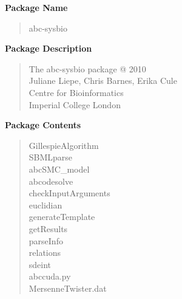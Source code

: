 \documentclass[a4paper]{report}
\begin{document}
\textbf{Package Name}
\begin{quote}abc-sysbio\end{quote}

\textbf{Package Description}
\begin{quote}
	The abc-sysbio package @ 2010\\
	Juliane Liepe, Chris Barnes, Erika Cule\\
	Centre for Bioinformatics\\
	Imperial College London\\
\end{quote}
    
\textbf{Package Contents}
\begin{quote}
    	GillespieAlgorithm\\
    	SBMLparse\\
    	abcSMC\_model\\
    	abcodesolve\\
    	checkInputArguments\\
    	euclidian\\
    	generateTemplate\\
    	getResults\\
    	parseInfo\\
    	relations\\
    	sdeint\\
	abccuda.py\\
	MersenneTwister.dat\\
\end{quote}



\end{document}
